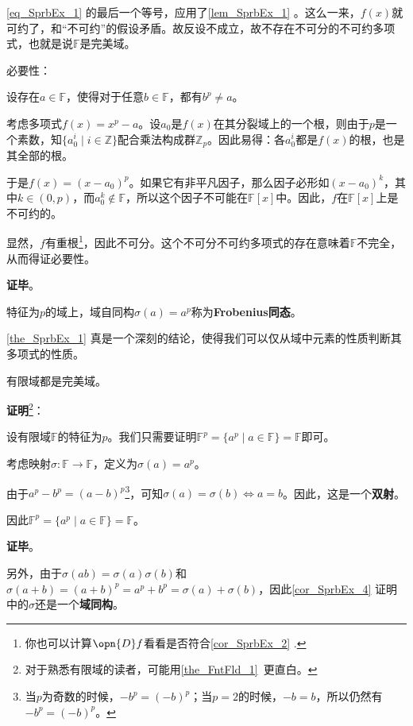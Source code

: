 \autoref{eq_SprbEx_1} 的最后一个等号，应用了\autoref{lem_SprbEx_1} 。这么一来，$f(x)$就可约了，和“不可约”的假设矛盾。故反设不成立，故不存在不可分的不可约多项式，也就是说$\mathbb{F}$是完美域。

必要性：

设存在$a\in\mathbb{F}$，使得对于任意$b\in\mathbb{F}$，都有$b^p\neq a$。

考虑多项式$f(x) = x^p-a$。设$a_0$是$f(x)$在其分裂域上的一个根，则由于$p$是一个素数，知$\{a_0^i\mid i\in\mathbb{Z}\}$配合乘法构成群$\mathbb{Z}_p$。因此易得：各$a_0^i$都是$f(x)$的根，也是其全部的根。

于是$f(x)=(x-a_0)^p$。如果它有非平凡因子，那么因子必形如$(x-a_0)^k$，其中$k\in(0, p)$，而$a_0^k\not\in\mathbb{F}$，所以这个因子不可能在$\mathbb{F}[x]$中。因此，$f$在$\mathbb{F}[x]$上是不可约的。

显然，$f$有重根\footnote{你也可以计算$\opn{D}f$看看是否符合\autoref{cor_SprbEx_2} .}，因此不可分。这个不可分不可约多项式的存在意味着$\mathbb{F}$不完全，从而得证必要性。

\textbf{证毕}。




特征为$p$的域上，域自同构$\sigma(a)=a^p$称为\textbf{Frobenius同态}。


\autoref{the_SprbEx_1} 真是一个深刻的结论，使得我们可以仅从域中元素的性质判断其多项式的性质。









\begin{corollary}{}\label{cor_SprbEx_4}
有限域都是完美域。
\end{corollary}

\textbf{证明}\footnote{对于熟悉有限域的读者，可能用\autoref{the_FntFld_1}~更直白。}：

设有限域$\mathbb{F}$的特征为$p$。我们只需要证明$\mathbb{F}^p=\{a^p\mid a\in\mathbb{F}\}=\mathbb{F}$即可。

考虑映射$\sigma:\mathbb{F}\to\mathbb{F}$，定义为$\sigma(a)=a^p$。

由于$a^p-b^p=(a-b)^p$\footnote{当$p$为奇数的时候，$-b^p=(-b)^p$；当$p=2$的时候，$-b=b$，所以仍然有$-b^p=(-b)^p$。}，可知$\sigma(a)=\sigma(b)\iff a=b$。因此，这是一个\textbf{双射}。

因此$\mathbb{F}^p=\{a^p\mid a\in\mathbb{F}\}=\mathbb{F}$。

\textbf{证毕}。

另外，由于$\sigma(ab)=\sigma(a)\sigma(b)$和$\sigma(a+b)=(a+b)^p=a^p+b^p=\sigma(a)+\sigma(b)$，因此\autoref{cor_SprbEx_4} 证明中的$\sigma$还是一个\textbf{域同构}。


